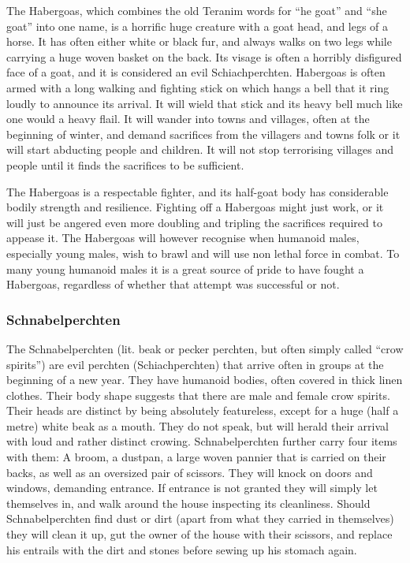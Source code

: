 The Habergoas, which combines the old Teranim words for ``he goat'' and ``she
goat'' into one name, is a horrific huge creature with a goat head, and legs
of a horse. It has often either white or black fur, and always walks on two
legs while carrying a huge woven basket on the back. Its visage is often a
horribly disfigured face of a goat, and it is considered an evil Schiachperchten.
Habergoas is often armed with a long walking and fighting stick on which hangs
a bell that it ring loudly to announce its arrival. It will wield that
stick and its heavy bell much like one would a heavy flail. It will wander
into towns and villages, often at the beginning of winter, and demand
sacrifices from the villagers and towns folk or it will start abducting people
and children. It will not stop terrorising villages and people until it finds
the sacrifices to be sufficient.

The Habergoas is a respectable fighter, and its half-goat body has
considerable bodily strength and resilience. Fighting off a Habergoas might
just work, or it will just be angered even more doubling and tripling the
sacrifices required to appease it. The Habergoas will however recognise when
humanoid males, especially young males, wish to brawl and will use non lethal
force in combat. To many young humanoid males it is a great source of pride
to have fought a Habergoas, regardless of whether that attempt was successful
or not.

\subsubsection{Schnabelperchten}
\label{sec:Schnabelperchten}

The Schnabelperchten (lit. beak or pecker perchten, but often simply called
``crow spirits'') are evil perchten (Schiachperchten) that arrive often in
groups at the beginning of a new year. They have humanoid bodies, often
covered in thick linen clothes. Their body shape suggests that there are male
and female crow spirits. Their heads are distinct by being absolutely
featureless, except for a huge (half a metre) white beak as a mouth. They do
not speak, but will herald their arrival with loud and rather distinct
crowing. Schnabelperchten further carry four items with them: A broom, a
dustpan, a large woven pannier that is carried on their backs, as well as an
oversized pair of scissors. They will knock on doors and windows, demanding
entrance. If entrance is not granted they will simply let themselves in, and
walk around the house inspecting its cleanliness. Should Schnabelperchten find
dust or dirt (apart from what they carried in themselves) they will clean it
up, gut the owner of the house with their scissors, and replace his entrails
with the dirt and stones before sewing up his stomach again.

